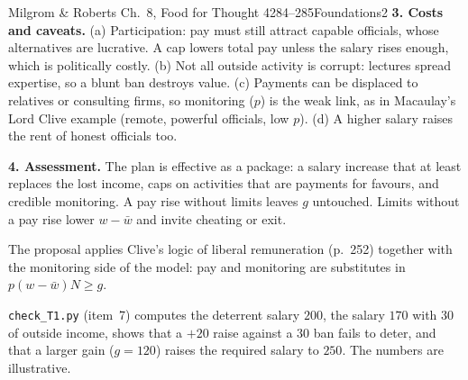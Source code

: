 \begin{exsol}{Milgrom \& Roberts Ch.~8, Food for Thought 4}{284--285}{Foundations}{2}
\textbf{3. Costs and caveats.} (a) Participation: pay must still attract capable officials, whose
alternatives are lucrative. A cap lowers total pay unless the salary rises enough, which is politically
costly. (b) Not all outside activity is corrupt: lectures spread expertise, so a blunt ban destroys value.
(c) Payments can be displaced to relatives or consulting firms, so monitoring ($p$) is the weak link, as in
Macaulay's Lord Clive example (remote, powerful officials, low $p$). (d) A higher salary raises the rent
of honest officials too.

\textbf{4. Assessment.} The plan is effective as a package: a salary increase that at least replaces
the lost income, caps on activities that are payments for favours, and credible monitoring. A pay rise
without limits leaves $g$ untouched. Limits without a pay rise lower $w - \bar w$ and invite cheating or
exit.

\interp The proposal applies Clive's logic of liberal remuneration (p.~252) together with the monitoring
side of the model: pay and monitoring are substitutes in $p(w-\bar w)N \ge g$.

\verify \texttt{check\_T1.py} (item~7) computes the deterrent salary $200$, the salary $170$ with $30$ of
outside income, shows that a $+20$ raise against a $30$ ban fails to deter, and that a larger gain
($g = 120$) raises the required salary to $250$. The numbers are illustrative.

\end{exsol}
